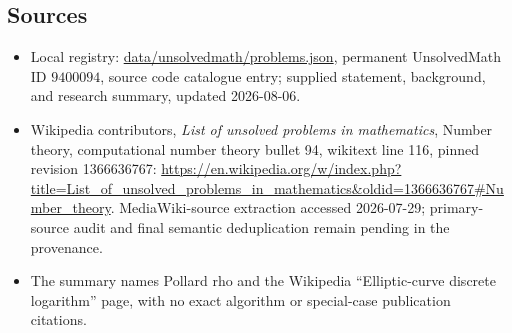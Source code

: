 \documentclass[11pt]{article}
\begin{document}
\subsection{Sources}
\begin{itemize}
\item Local registry: \url{data/unsolvedmath/problems.json}, permanent UnsolvedMath ID \(9400094\), source code catalogue entry; supplied statement, background, and research summary, updated 2026-08-06.
\item Wikipedia contributors, \emph{List of unsolved problems in mathematics}, Number theory, computational number theory bullet 94, wikitext line 116, pinned revision 1366636767: \url{https://en.wikipedia.org/w/index.php?title=List_of_unsolved_problems_in_mathematics&oldid=1366636767#Number_theory}. MediaWiki-source extraction accessed 2026-07-29; primary-source audit and final semantic deduplication remain pending in the provenance.
\item The summary names Pollard rho and the Wikipedia ``Elliptic-curve discrete logarithm'' page, with no exact algorithm or special-case publication citations.
\end{itemize}
\end{document}
